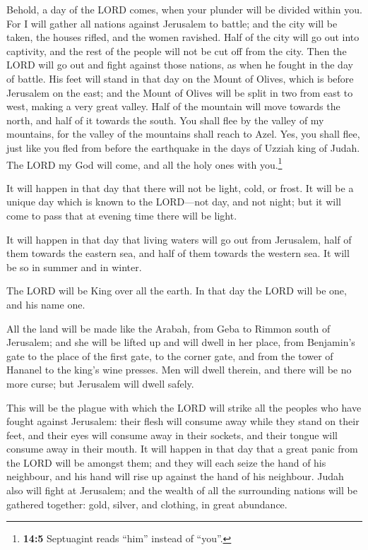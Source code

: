  Behold, a day of the LORD comes, when your plunder will
be divided within you.  For I will gather all nations
against Jerusalem to battle; and the city will be taken, the houses
rifled, and the women ravished. Half of the city will go out into
captivity, and the rest of the people will not be cut off from the city.
 Then the LORD will go out and fight against those
nations, as when he fought in the day of battle.  His feet
will stand in that day on the Mount of Olives, which is before Jerusalem
on the east; and the Mount of Olives will be split in two from east to
west, making a very great valley. Half of the mountain will move towards
the north, and half of it towards the south.  You shall
flee by the valley of my mountains, for the valley of the mountains
shall reach to Azel. Yes, you shall flee, just like you fled from before
the earthquake in the days of Uzziah king of Judah. The LORD my God will
come, and all the holy ones with you.\footnote{\textbf{14:5} Septuagint
  reads ``him'' instead of ``you''.}

 It will happen in that day that there will not be light,
cold, or frost.  It will be a unique day which is known to
the LORD---not day, and not night; but it will come to pass that at
evening time there will be light.

 It will happen in that day that living waters will go out
from Jerusalem, half of them towards the eastern sea, and half of them
towards the western sea. It will be so in summer and in winter.

 The LORD will be King over all the earth. In that day the
LORD will be one, and his name one.

 All the land will be made like the Arabah, from Geba to
Rimmon south of Jerusalem; and she will be lifted up and will dwell in
her place, from Benjamin's gate to the place of the first gate, to the
corner gate, and from the tower of Hananel to the king's wine presses.
 Men will dwell therein, and there will be no more curse;
but Jerusalem will dwell safely.

 This will be the plague with which the LORD will strike
all the peoples who have fought against Jerusalem: their flesh will
consume away while they stand on their feet, and their eyes will consume
away in their sockets, and their tongue will consume away in their
mouth.  It will happen in that day that a great panic
from the LORD will be amongst them; and they will each seize the hand of
his neighbour, and his hand will rise up against the hand of his
neighbour.  Judah also will fight at Jerusalem; and the
wealth of all the surrounding nations will be gathered together: gold,
silver, and clothing, in great abundance.

